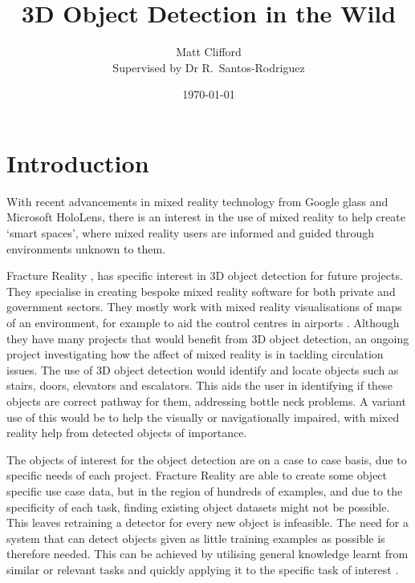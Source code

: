 \documentclass[11pt]{article}
\title{3D Object Detection in the Wild}
\author{Matt Clifford \\ Supervised by Dr R.\ Santos-Rodriguez}
\date{\today}
\begin{document}
\maketitle

\section{Introduction}
With recent advancements in mixed reality technology from Google glass and Microsoft HoloLens, there is an interest in the use of mixed reality to help create `smart spaces', where mixed reality users are informed and guided through environments unknown to them.

Fracture Reality \cite{fracture}, has specific interest in 3D object detection for future projects. They specialise in creating bespoke mixed reality software for both private and government sectors. They mostly work with mixed reality visualisations of maps of an environment, for example to aid the control centres in airports \cite{youtube}. Although they have many projects that would benefit from 3D object detection, an ongoing project investigating how the affect of mixed reality is in tackling circulation issues. The use of 3D object detection would identify and locate objects such as stairs, doors, elevators and escalators. This aids the user in identifying if these objects are correct pathway for them, addressing bottle neck problems. A variant use of this would be to help the visually or navigationally impaired, with mixed reality help from detected objects of importance.

The objects of interest for the object detection are on a case to case basis, due to specific needs of each project. Fracture Reality are able to create some object specific use case data, but in the region of hundreds of examples, and due to the specificity of each task, finding existing object datasets might not be possible. This leaves retraining a detector for every new object is infeasible. The need for a system that can detect objects given as little training examples as possible is therefore needed. This can be achieved by utilising general knowledge learnt from similar or relevant tasks and quickly applying it to the specific task of interest \cite{DeCAF}.
\end{document}
